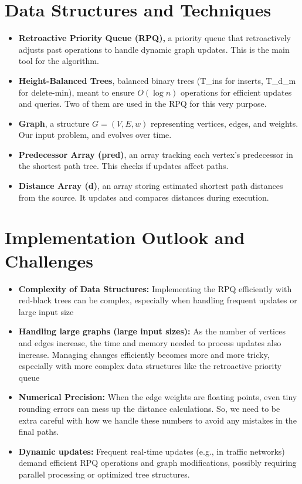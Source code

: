 \documentclass[12pt]{article}
\begin{document}
\section*{Data Structures and Techniques} 
\begin{itemize}
\item  \textbf{Retroactive Priority Queue (RPQ),} a priority queue that retroactively adjusts past operations to handle dynamic graph updates. This is the main tool for the algorithm.

\item \textbf{Height-Balanced Trees}, balanced binary trees (T\_ins for inserts, T\_d\_m for delete-min), meant to ensure $O(\log n)$ operations for efficient updates and queries. Two of them are used in the RPQ for this very purpose.

\item \textbf{Graph}, a structure $G = (V, E, w)$ representing vertices, edges, and weights. Our input problem, and evolves over time.

\item \textbf{Predecessor Array (pred)}, an array tracking each vertex’s predecessor in the shortest path tree. This checks if updates affect paths. 

\item \textbf{Distance Array (d)}, an array storing estimated shortest path distances from the source. It updates and compares distances during execution. 
\end{itemize}

\section*{Implementation Outlook and Challenges}

\begin{itemize}
    \item \textbf{Complexity of Data Structures:} Implementing the RPQ efficiently with red-black trees can be complex, especially when handling frequent updates or large input size
\item \textbf{Handling large graphs (large input sizes):} As the number of vertices and edges increase, the time and memory needed to process updates also increase. Managing changes efficiently becomes more and more tricky, especially with more complex data structures like the retroactive priority queue 
\item \textbf{Numerical Precision:} When the edge weights are floating points, even tiny rounding errors can mess up the distance calculations. So, we need to be extra careful with how we handle these numbers to avoid any mistakes in the final paths.
\item \textbf{Dynamic updates:} Frequent real-time updates (e.g., in traffic networks) demand efficient RPQ operations and graph modifications, possibly requiring parallel processing or optimized tree structures.

\end{itemize}





 
        
\end{document}

